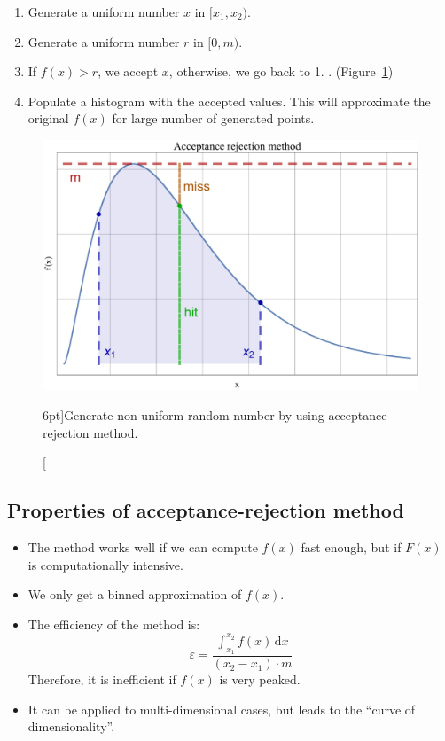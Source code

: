\begin{enumerate}
	\item Generate a uniform number $x$ in $[x_{1}, x_{2})$.
	\item Generate a uniform number $r$ in $[0, m)$.
	\item If $f(x) > r$, we accept $x$, otherwise, we go back to 1. . (Figure~\ref{fig:acceptance_rejection})
	\item Populate a histogram with the accepted values. This will approximate the original $f(x)$ for large number of generated points.
\end{enumerate}

\begin{figure}
	\includegraphics{monte_carlo/acceptance_rejection_method.pdf}
	\caption[Acceptance-rejection method.][6pt]{Generate non-uniform random number by using acceptance-rejection method.}
	\label{fig:acceptance_rejection}
\end{figure}

\subsection{Properties of acceptance-rejection method}
\label{subsec:prop_of_acceptance_rejection}

\begin{itemize}[$\to$]
	\item The method works well if we can compute $f(x)$ fast enough, but if $F(x)$ is computationally intensive.
	\item We only get a binned approximation of $f(x)$.
	\item The efficiency of the method is:
		$$
		\varepsilon = \frac{\int_{x_{1}}^{x_{2}}{f(x)} \,\mathrm{d}x}{(x_{2} - x_{1}) \cdot m}
		$$
		Therefore, it is inefficient if $f(x)$ is very peaked.
	\item It can be applied to multi-dimensional cases, but leads to the “curve of dimensionality”.
\end{itemize}

